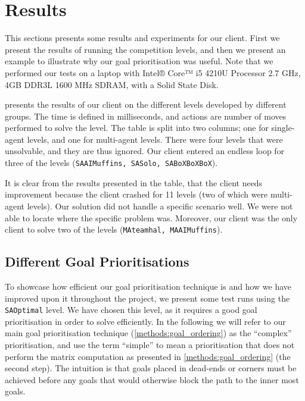 \section{Results}
\label{sec:results}


This sections presents some results and experiments for our client.
First we present the results of running the competition levels, and then we present an example to illustrate why our goal prioritisation was useful.
Note that we performed our tests on a laptop with Intel® Core™ i5 4210U Processor 2.7 GHz, 4GB DDR3L 1600 MHz SDRAM, with a Solid State Disk.

 presents the results of our client on the different levels developed by different groups.
The time is defined in milliseconds, and actions are number of moves performed to solve the level.
The table is split into two columns; one for single-agent levels, and one for multi-agent levels.
There were four levels that were unsolvable, and they are thus ignored.
Our client entered an endless loop for three of the levels (\texttt{SAAIMuffins, SASolo, SABoXBoXBoX}).

It is clear from the results presented in the table, that the client needs improvement because the client crashed for 11 levels (two of which were multi-agent levels).
Our solution did not handle a specific scenario well.
We were not able to locate where the specific problem was.
Moreover, our client was the only client to solve two of the levels (\texttt{MAteamhal, MAAIMuffins}).



\subsection{Different Goal Prioritisations}

To showcase how efficient our goal prioritisation technique is and how we have improved upon it throughout the project, we present some test runs using the \texttt{SAOptimal} level. 
We have chosen this level, as it requires a good goal prioritisation in order to solve efficiently.
In the following we will refer to our main goal prioritisation technique (\cref{methods:goal_ordering}) as the ``complex'' prioritisation, and use the term ``simple'' to mean a prioritisation that does not perform the matrix computation as presented in \cref{methods:goal_ordering} (the second step).
The intuition is that goals placed in dead-ends or corners must be achieved before any goals that would otherwise block the path to the inner most goals.

